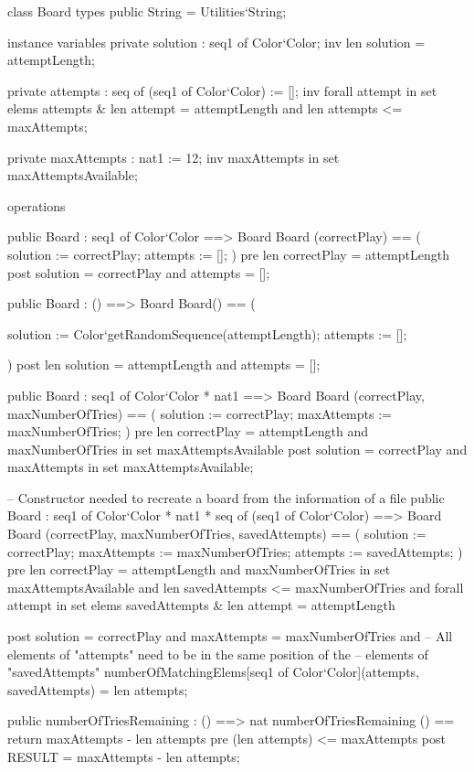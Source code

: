 \begin{vdm_al}
class Board
 types
  public String = Utilities`String;

 instance variables
  private solution : seq1 of Color`Color;
  inv len solution = attemptLength;

  private attempts : seq of (seq1 of Color`Color) := [];
  inv forall attempt in set elems attempts & len attempt = attemptLength and
   len attempts <= maxAttempts;

  private maxAttempts : nat1 := 12;
  inv maxAttempts in set maxAttemptsAvailable;


 operations


  public Board : seq1 of Color`Color ==> Board
  Board (correctPlay) == (
   solution := correctPlay;
   attempts := [];
  )
  pre len correctPlay = attemptLength
  post solution = correctPlay and
   attempts = [];


  public Board : () ==> Board
  Board() == (

   solution := Color`getRandomSequence(attemptLength);
   attempts := [];

  )
  post len solution = attemptLength and attempts = [];


  public Board : seq1 of Color`Color * nat1 ==> Board
  Board (correctPlay, maxNumberOfTries) == (
   solution := correctPlay;
   maxAttempts := maxNumberOfTries;
  )
  pre len correctPlay = attemptLength and
   maxNumberOfTries in set maxAttemptsAvailable
  post solution = correctPlay and
   maxAttempts in set maxAttemptsAvailable;


  -- Constructor needed to recreate a board from the information of a file
  public Board : seq1 of Color`Color * nat1 * seq of (seq1 of Color`Color) ==> Board
  Board (correctPlay, maxNumberOfTries, savedAttempts) == (
   solution := correctPlay;
   maxAttempts := maxNumberOfTries;
   attempts := savedAttempts;
  )
  pre len correctPlay = attemptLength and
   maxNumberOfTries in set maxAttemptsAvailable and
   len savedAttempts <= maxNumberOfTries and
   forall attempt in set elems savedAttempts & len attempt = attemptLength

  post solution = correctPlay and
   maxAttempts = maxNumberOfTries and
   -- All elements of "attempts" need to be in the same position of the
   -- elements of "savedAttempts"
   numberOfMatchingElems[seq1 of Color`Color](attempts, savedAttempts) = len attempts;



  public numberOfTriesRemaining : () ==> nat
   numberOfTriesRemaining () == return maxAttempts - len attempts
  pre (len attempts) <= maxAttempts
  post RESULT = maxAttempts - len attempts;



\end{vdm_al}
